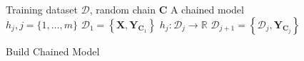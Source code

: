 \documentclass{article}
\newcommand{\set}[1]{{\left\{#1\right\}}}
\begin{document}
\begin{figure}[t!]
\centering
\begin{minipage}{0.65\textwidth}
\begin{algorithm}[H]
\centering \small
\caption*{Build Chained Model}
\begin{algorithmic}[1]
\renewcommand{\algorithmicrequire}{\textbf{Input:}}
\renewcommand{\algorithmicensure}{\textbf{Output:}}
\Require Training dataset $\mathcal{D}$, random chain $\bm C$
\Ensure  A chained model $h_j, j = \{1,\ldots,m\}$
\State $\mathcal{D}_1 = \set{\bm X, \bm Y_{\bm C_1}}$ 
 
\State $h_j : \mathcal{D}_j \rightarrow \mathbb{R}$ 
\State $\mathcal{D}_{j+1} = \set{\mathcal{D}_j, \bm Y_{\bm C_j}}$ 
\EndIf
\EndFor 
\end{algorithmic} 
\end{algorithm}
\end{minipage}
\end{figure}


\end{document}
